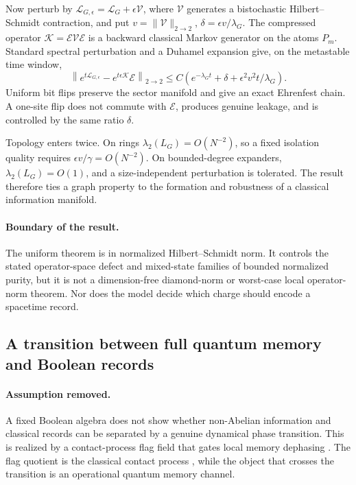 Now perturb by
\(\mathcal L_{G,\epsilon}=\mathcal L_G+\epsilon\mathcal V\), where
\(\mathcal V\) generates a bistochastic Hilbert--Schmidt contraction, and
put \(v=\|\mathcal V\|_{2\to2}\),
\(\delta=\epsilon v/\lambda_G\).  The compressed operator
\(\mathcal K=\mathcal E\mathcal V\mathcal E\) is a backward classical Markov
generator on the atoms \(P_m\).  Standard spectral perturbation and a
Duhamel expansion give, on the metastable time window,
\begin{equation}
 \left\|
 e^{t\mathcal L_{G,\epsilon}}
 -e^{t\epsilon\mathcal K}\mathcal E
 \right\|_{2\to2}
 \le C\!\left(e^{-\lambda_Gt}+\delta
 +\epsilon^2 v^2t/\lambda_G\right).
 \label{eq:loop-metastable}
\end{equation}
Uniform bit flips preserve the sector manifold and give an exact Ehrenfest
chain.  A one-site flip does not commute with \(\mathcal E\), produces
genuine leakage, and is controlled by the same ratio \(\delta\).

Topology enters twice.  On rings
\(\lambda_2(L_G)=O(N^{-2})\), so a fixed isolation quality requires
\(\epsilon v/\gamma=O(N^{-2})\).  On bounded-degree expanders,
\(\lambda_2(L_G)=O(1)\), and a size-independent perturbation is tolerated.
The result therefore ties a graph property to the formation and robustness
of a classical information manifold.

\paragraph{Boundary of the result.}
The uniform theorem is in normalized Hilbert--Schmidt norm.  It controls
the stated operator-space defect and mixed-state families of bounded
normalized purity, but it is not a dimension-free diamond-norm or
worst-case local operator-norm theorem.  Nor does the model decide which
charge should encode a spacetime record.

\subsection{A transition between full quantum memory and Boolean records}
\label{sec:loop-memory}

\paragraph{Assumption removed.}
A fixed Boolean algebra does not show whether non-Abelian information and
classical records can be separated by a genuine dynamical phase transition.
This is realized by a contact-process flag field that gates local memory
dephasing \cite{XuMemory2026}.  The flag quotient is the classical contact
process \cite{Harris1974,Liggett1999}, while the object that crosses the
transition is an operational quantum memory channel.

